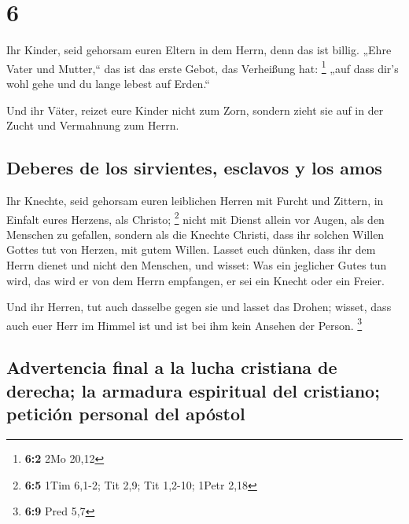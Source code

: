 \hypertarget{section-5}{%
\section{6}\label{section-5}}

 Ihr Kinder, seid gehorsam euren Eltern in dem Herrn, denn
das ist billig.  „Ehre Vater und Mutter,`` das ist das
erste Gebot, das Verheißung hat: \footnote{\textbf{6:2} 2Mo 20,12}
 „auf dass dir's wohl gehe und du lange lebest auf
Erden.``

 Und ihr Väter, reizet eure Kinder nicht zum Zorn, sondern
zieht sie auf in der Zucht und Vermahnung zum Herrn.

\hypertarget{deberes-de-los-sirvientes-esclavos-y-los-amos}{%
\subsection{Deberes de los sirvientes, esclavos y los
amos}\label{deberes-de-los-sirvientes-esclavos-y-los-amos}}

 Ihr Knechte, seid gehorsam euren leiblichen Herren mit
Furcht und Zittern, in Einfalt eures Herzens, als Christo; \footnote{\textbf{6:5}
  1Tim 6,1-2; Tit 2,9; Tit 1,2-10; 1Petr 2,18}  nicht mit
Dienst allein vor Augen, als den Menschen zu gefallen, sondern als die
Knechte Christi, dass ihr solchen Willen Gottes tut von Herzen, mit
gutem Willen.  Lasset euch dünken, dass ihr dem Herrn
dienet und nicht den Menschen,  und wisset: Was ein
jeglicher Gutes tun wird, das wird er von dem Herrn empfangen, er sei
ein Knecht oder ein Freier.

 Und ihr Herren, tut auch dasselbe gegen sie und lasset
das Drohen; wisset, dass auch euer Herr im Himmel ist und ist bei ihm
kein Ansehen der Person. \footnote{\textbf{6:9} Pred 5,7}

\hypertarget{advertencia-final-a-la-lucha-cristiana-de-derecha-la-armadura-espiritual-del-cristiano-peticiuxf3n-personal-del-apuxf3stol}{%
\subsection{Advertencia final a la lucha cristiana de derecha; la
armadura espiritual del cristiano; petición personal del
apóstol}\label{advertencia-final-a-la-lucha-cristiana-de-derecha-la-armadura-espiritual-del-cristiano-peticiuxf3n-personal-del-apuxf3stol}}

